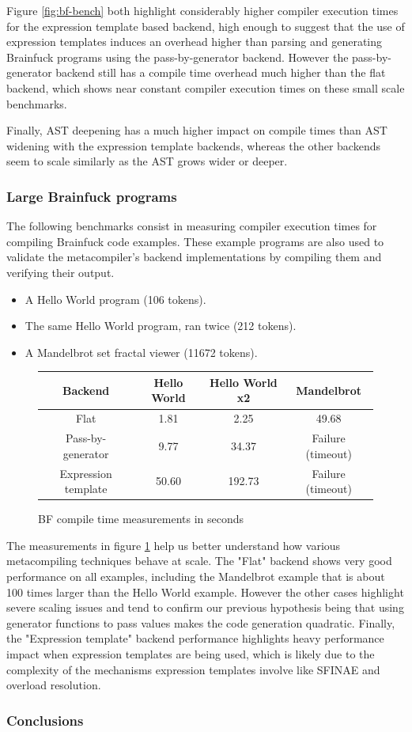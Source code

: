 \documentclass[../main]{subfiles}
\begin{document}
Figure \ref{fig:bf-bench}
both highlight considerably higher compiler execution times for the expression
template based backend, high enough to suggest that the use of expression
templates induces an overhead higher than parsing and generating Brainfuck
programs using the pass-by-generator backend. However the pass-by-generator
backend still has a compile time overhead much higher than the flat backend,
which shows near constant compiler execution times on these small scale
benchmarks.

Finally, AST deepening has a much higher impact on compile times than AST
widening with the expression template backends, whereas the other backends seem
to scale similarly as the AST grows wider or deeper.

\subsubsection{
  Large Brainfuck programs
}

The following benchmarks consist in measuring compiler execution times for
compiling Brainfuck code examples. These example programs are also used to
validate the metacompiler's backend implementations by compiling them and
verifying their output.

\begin{itemize}
\item A Hello World program (106 tokens).
\item The same Hello World program, ran twice (212 tokens).
\item A Mandelbrot set fractal viewer (11672 tokens).
\end{itemize}

\begin{figure}
\begin{tabular}{|c|c|c|c|}
\hline
Backend             & Hello World & Hello World x2  & Mandelbrot \\
\hline
Flat                & 1.81        & 2.25            & 49.68 \\
Pass-by-generator   & 9.77        & 34.37           & Failure (timeout) \\
Expression template & 50.60       & 192.73          & Failure (timeout) \\
\hline
\end{tabular}
\caption{BF compile time measurements in seconds
}\label{fig:BF-compile-times}
\end{figure}

The measurements in figure \ref{fig:BF-compile-times} help us better understand
how various metacompiling techniques behave at scale. The "Flat" backend shows
very good performance on all examples, including the Mandelbrot example that is
about 100 times larger than the Hello World example. However the other cases
highlight severe scaling issues and tend to confirm our previous hypothesis
being that using generator functions to pass values makes the code generation
quadratic. Finally, the "Expression template" backend performance highlights
heavy performance impact when expression templates are being used, which is
likely due to the complexity of the mechanisms expression templates involve like
SFINAE and overload resolution.

\subsubsection{
  Conclusions
}
\end{document}
